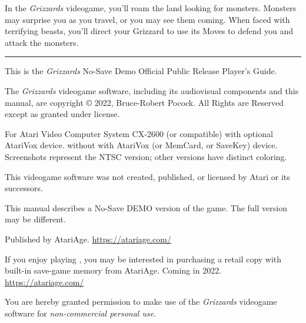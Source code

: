 \documentclass[9pt,twocolumn,openany,article]{memoir}
\newcommand\picaskip{\vspace{12pt}}
\begin{document}
\bigskip

In the  \textit{Grizzards} videogame, you'll  roam the land  looking for
monsters. Monsters may  surprise you as you travel, or  you may see them
coming. When faced  with terrifying beasts, you'll  direct your Grizzard
to use its Moves to defend you and attack the monsters.

\vfill
\noindent\rule{\pagewidth}{0.4pt}
\picaskip

{ \footnotesize This is the \textit{Grizzards} \ifdefined\NOSAVE No-Save
  \fi\ifdefined\DEMO  Demo   \fi\ifdefined\ATARIAGESAVE  Official  \else
  Public Release \fi Player's Guide. }

\picaskip

{ \footnotesize The \textit{Grizzards} videogame software, including its
  audiovisual  components and  this manual,  are copyright  \copyright{}
  2022, Bruce-Robert Pocock.  All Rights are Reserved  except as granted
  under license. }

\picaskip

{ \footnotesize For Atari Video  Computer System CX-2600 (or compatible)
  \ifdefined\ATARIAGESAVE   with   optional   AtariVox   device.   \else
  \ifdefined\NOSAVE  without \else  with  \fi AtariVox  (or MemCard,  or
  SaveKey)  device. \fi  Screenshots represent  the NTSC  version; other
  versions have distinct coloring. }

\picaskip

{ \footnotesize This  videogame software was not  created, published, or
  licensed by Atari or its successors. }

\picaskip

\ifdefined\DEMO
\bigskip

This manual  describes a \ifdefined\NOSAVE  No-Save \fi DEMO  version of
the game. The full version may be different.

\fi

Published by AtariAge. \href{https://atariage.com/}{https://atariage.com/}

\ifdefined\ATARIAGESAVE\else  If you  enjoy playing  ,
you  may  be  interested  in  purchasing a  retail  copy  with  built-in
save-game    memory    from    AtariAge.    Coming    in    2022.  
\href{https://atariage.com/}{https://atariage.com/}

\bigskip

You are hereby granted permission  to make use of the \textit{Grizzards}
videogame software for \emph{non-commercial personal use}.
\end{document}

